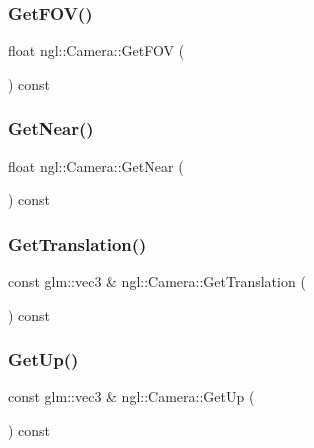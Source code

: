 \subsubsection{\texorpdfstring{Get\+F\+O\+V()}{GetFOV()}}
{\footnotesize\ttfamily float ngl\+::\+Camera\+::\+Get\+F\+OV (\begin{DoxyParamCaption}{ }\end{DoxyParamCaption}) const}

\mbox{\label{classngl_1_1_camera_a5c2aa8906d05678bf32a1ad30659d164}} 
\subsubsection{\texorpdfstring{Get\+Near()}{GetNear()}}
{\footnotesize\ttfamily float ngl\+::\+Camera\+::\+Get\+Near (\begin{DoxyParamCaption}{ }\end{DoxyParamCaption}) const}

\mbox{\label{classngl_1_1_camera_a7199b6bc990cbdd41501fba153595e1d}} 
\subsubsection{\texorpdfstring{Get\+Translation()}{GetTranslation()}}
{\footnotesize\ttfamily const glm\+::vec3 \& ngl\+::\+Camera\+::\+Get\+Translation (\begin{DoxyParamCaption}{ }\end{DoxyParamCaption}) const}

\mbox{\label{classngl_1_1_camera_ad38adb365c3f32e83d9f7a7222098d5c}} 
\subsubsection{\texorpdfstring{Get\+Up()}{GetUp()}}
{\footnotesize\ttfamily const glm\+::vec3 \& ngl\+::\+Camera\+::\+Get\+Up (\begin{DoxyParamCaption}{ }\end{DoxyParamCaption}) const}

